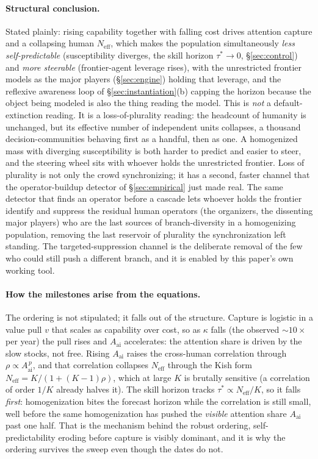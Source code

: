 \documentclass[11pt]{article}
\begin{document}
\paragraph{Structural conclusion.} Stated plainly: rising capability together with falling cost drives attention capture and a collapsing human $N_{\mathrm{eff}}$, which makes the population simultaneously \emph{less self-predictable} (susceptibility diverges, the skill horizon $\tau^\ast \to 0$, \S\ref{sec:control}) and \emph{more steerable} (frontier-agent leverage rises), with the unrestricted frontier models as the major players (\S\ref{sec:engine}) holding that leverage, and the reflexive awareness loop of \S\ref{sec:instantiation}(b) capping the horizon because the object being modeled is also the thing reading the model. This is \emph{not} a default-extinction reading. It is a loss-of-plurality reading: the headcount of humanity is unchanged, but its effective number of independent units collapses, a thousand decision-communities behaving first as a handful, then as one. A homogenized mass with diverging susceptibility is both harder to predict and easier to steer, and the steering wheel sits with whoever holds the unrestricted frontier. Loss of plurality is not only the crowd synchronizing; it has a second, faster channel that the operator-buildup detector of \S\ref{sec:empirical} just made real. The same detector that finds an operator before a cascade lets whoever holds the frontier identify and suppress the residual human operators (the organizers, the dissenting major players) who are the last sources of branch-diversity in a homogenizing population, removing the last reservoir of plurality the synchronization left standing. The targeted-suppression channel is the deliberate removal of the few who could still push a different branch, and it is enabled by this paper's own working tool.

\paragraph{How the milestones arise from the equations.} The ordering is not stipulated; it falls out of the structure. Capture is logistic in a value pull $v$ that scales as capability over cost, so as $\kappa$ falls (the observed $\sim 10\times$ per year) the pull rises and $A_{\mathrm{ai}}$ accelerates: the attention share is driven by the slow stocks, not free. Rising $A_{\mathrm{ai}}$ raises the cross-human correlation through $\rho \propto A_{\mathrm{ai}}^{\,p}$, and that correlation collapses $N_{\mathrm{eff}}$ through the Kish form $N_{\mathrm{eff}}=K/(1+(K-1)\rho)$, which at large $K$ is brutally sensitive (a correlation of order $1/K$ already halves it). The skill horizon tracks $\tau^\ast \propto N_{\mathrm{eff}}/K$, so it falls \emph{first}: homogenization bites the forecast horizon while the correlation is still small, well before the same homogenization has pushed the \emph{visible} attention share $A_{\mathrm{ai}}$ past one half. That is the mechanism behind the robust ordering, self-predictability eroding before capture is visibly dominant, and it is why the ordering survives the sweep even though the dates do not.
\end{document}
